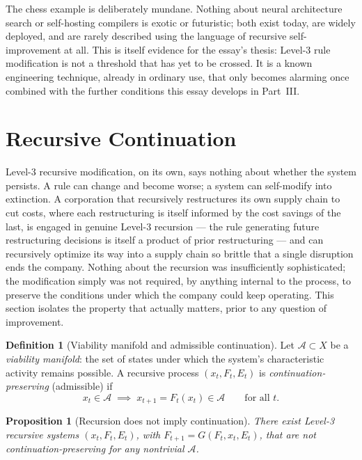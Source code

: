 \documentclass[11pt,a4paper]{article}
\theoremstyle{plain}
\newtheorem{proposition}[theorem]{Proposition}
\theoremstyle{definition}
\newtheorem{definition}[theorem]{Definition}
\theoremstyle{remark}
\newcommand{\Adm}{\mathcal{A}}
\begin{document}
The chess example is deliberately mundane. Nothing about neural architecture search or self-hosting compilers is exotic or futuristic; both exist today, are widely deployed, and are rarely described using the language of recursive self-improvement at all. This is itself evidence for the essay's thesis: Level-3 rule modification is not a threshold that has yet to be crossed. It is a known engineering technique, already in ordinary use, that only becomes alarming once combined with the further conditions this essay develops in Part~III.

\section{Recursive Continuation}
\label{sec:recursive-continuation}

Level-3 recursive modification, on its own, says nothing about whether the system persists. A rule can change and become worse; a system can self-modify into extinction. A corporation that recursively restructures its own supply chain to cut costs, where each restructuring is itself informed by the cost savings of the last, is engaged in genuine Level-3 recursion — the rule generating future restructuring decisions is itself a product of prior restructuring — and can recursively optimize its way into a supply chain so brittle that a single disruption ends the company. Nothing about the recursion was insufficiently sophisticated; the modification simply was not required, by anything internal to the process, to preserve the conditions under which the company could keep operating. This section isolates the property that actually matters, prior to any question of improvement.

\begin{definition}[Viability manifold and admissible continuation]
\label{def:admissibility}
Let $\Adm \subset X$ be a \emph{viability manifold}: the set of states under which the system's characteristic activity remains possible. A recursive process $(x_t, F_t, E_t)$ is \emph{continuation-preserving} (admissible) if
\[
x_t \in \Adm \;\implies\; x_{t+1} = F_t(x_t) \in \Adm \qquad \text{for all } t.
\]
\end{definition}

\begin{proposition}[Recursion does not imply continuation]
\label{prop:no-implication}
There exist Level-3 recursive systems $(x_t, F_t, E_t)$, with $F_{t+1}=G(F_t,x_t,E_t)$, that are not continuation-preserving for any nontrivial $\Adm$.
\end{proposition}
\end{document}
